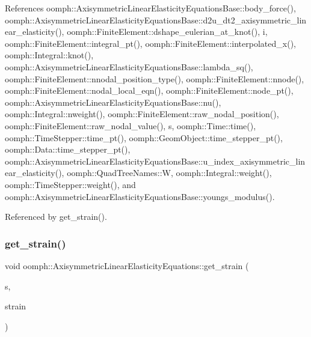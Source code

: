 References oomph\+::\+Axisymmetric\+Linear\+Elasticity\+Equations\+Base\+::body\+\_\+force(), oomph\+::\+Axisymmetric\+Linear\+Elasticity\+Equations\+Base\+::d2u\+\_\+dt2\+\_\+axisymmetric\+\_\+linear\+\_\+elasticity(), oomph\+::\+Finite\+Element\+::dshape\+\_\+eulerian\+\_\+at\+\_\+knot(), i, oomph\+::\+Finite\+Element\+::integral\+\_\+pt(), oomph\+::\+Finite\+Element\+::interpolated\+\_\+x(), oomph\+::\+Integral\+::knot(), oomph\+::\+Axisymmetric\+Linear\+Elasticity\+Equations\+Base\+::lambda\+\_\+sq(), oomph\+::\+Finite\+Element\+::nnodal\+\_\+position\+\_\+type(), oomph\+::\+Finite\+Element\+::nnode(), oomph\+::\+Finite\+Element\+::nodal\+\_\+local\+\_\+eqn(), oomph\+::\+Finite\+Element\+::node\+\_\+pt(), oomph\+::\+Axisymmetric\+Linear\+Elasticity\+Equations\+Base\+::nu(), oomph\+::\+Integral\+::nweight(), oomph\+::\+Finite\+Element\+::raw\+\_\+nodal\+\_\+position(), oomph\+::\+Finite\+Element\+::raw\+\_\+nodal\+\_\+value(), s, oomph\+::\+Time\+::time(), oomph\+::\+Time\+Stepper\+::time\+\_\+pt(), oomph\+::\+Geom\+Object\+::time\+\_\+stepper\+\_\+pt(), oomph\+::\+Data\+::time\+\_\+stepper\+\_\+pt(), oomph\+::\+Axisymmetric\+Linear\+Elasticity\+Equations\+Base\+::u\+\_\+index\+\_\+axisymmetric\+\_\+linear\+\_\+elasticity(), oomph\+::\+Quad\+Tree\+Names\+::W, oomph\+::\+Integral\+::weight(), oomph\+::\+Time\+Stepper\+::weight(), and oomph\+::\+Axisymmetric\+Linear\+Elasticity\+Equations\+Base\+::youngs\+\_\+modulus().



Referenced by get\+\_\+strain().

\mbox{\label{classoomph_1_1AxisymmetricLinearElasticityEquations_a079d1722a01188f2e06911932af3da1f}} 
\subsubsection{\texorpdfstring{get\+\_\+strain()}{get\_strain()}}
{\footnotesize\ttfamily void oomph\+::\+Axisymmetric\+Linear\+Elasticity\+Equations\+::get\+\_\+strain (\begin{DoxyParamCaption}\item[{const \hyperlink{classoomph_1_1Vector}{Vector}$<$ double $>$ \&}]{s,  }\item[{\hyperlink{classoomph_1_1DenseMatrix}{Dense\+Matrix}$<$ double $>$ \&}]{strain }\end{DoxyParamCaption})}



